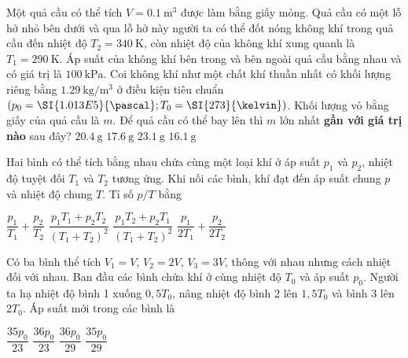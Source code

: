 \begin{ex}
	Một quả cầu có thể tích $V=\SI{0.1}{\meter^3}$ được làm bằng giấy mỏng. Quả cầu có một lỗ hở nhỏ bên dưới và qua lỗ hở này người ta có thể đốt nóng không khí trong quả cầu đến nhiệt độ $T_2=\SI{340}{\kelvin}$, còn nhiệt độ của không khí xung quanh là $T_1=\SI{290}{\kelvin}$. Áp suất của không khí bên trong và bên ngoài quả cầu bằng nhau và có giá trị là $\SI{100}{\kilo\pascal}$. Coi không khí như một chất khí thuần nhất có khối lượng riêng bằng $\SI{1.29}{\kilogram/\meter^3}$ ở điều kiện tiêu chuẩn $\left(p_0=\SI{1.013E5}{\pascal}; T_0=\SI{273}{\kelvin}\right)$. Khối lượng vỏ bằng giấy của quả cầu là $m$. Để quả cầu có thể bay lên thì $m$ lớn nhất \textbf{gần với giá trị nào} sau đây?
	\choice
	{$\SI{20.4}{\gram}$}
	{\True $\SI{17.6}{\gram}$}
	{$\SI{23.1}{\gram}$}
	{$\SI{16.1}{\gram}$}
\end{ex}
\begin{ex}
	Hai bình có thể tích bằng nhau chứa cùng một loại khí ở áp suất $p_1$ và $p_2$, nhiệt độ tuyệt đối $T_1$ và $T_2$ tương ứng. Khi nối các bình, khí đạt đến áp suất chung $p$ và nhiệt độ chung $T$. Tỉ số $p/T$ bằng
	
	\choice
	{$\dfrac{p_1}{T_1}+\dfrac{p_2}{T_2}$}
	{$\dfrac{p_1T_1+p_2T_2}{\left(T_1+T_2\right)^2}$}
	{$\dfrac{p_1T_2+p_2T_1}{\left(T_1+T_2\right)^2}$}
	{\True $\dfrac{p_1}{2T_1}+\dfrac{p_2}{2T_2}$}
\end{ex}
\begin{ex}
	Có ba bình thể tích $V_1=V$, $V_2=2V$, $V_3=3V$, thông với nhau nhưng cách nhiệt đối với nhau. Ban đầu các bình chứa khí ở cùng nhiệt độ $T_0$ và áp suất $p_0$. Người ta hạ nhiệt độ bình 1 xuống $0,5T_0$, nâng nhiệt độ bình 2 lên $1,5T_0$ và bình 3 lên $2T_0$. Áp suất mới trong các bình là
	
	\choice
	{$\dfrac{35p_0}{23}$}
	{$\dfrac{36p_0}{23}$}
	{\True $\dfrac{36p_0}{29}$}
	{$\dfrac{35p_0}{29}$}
\end{ex}
